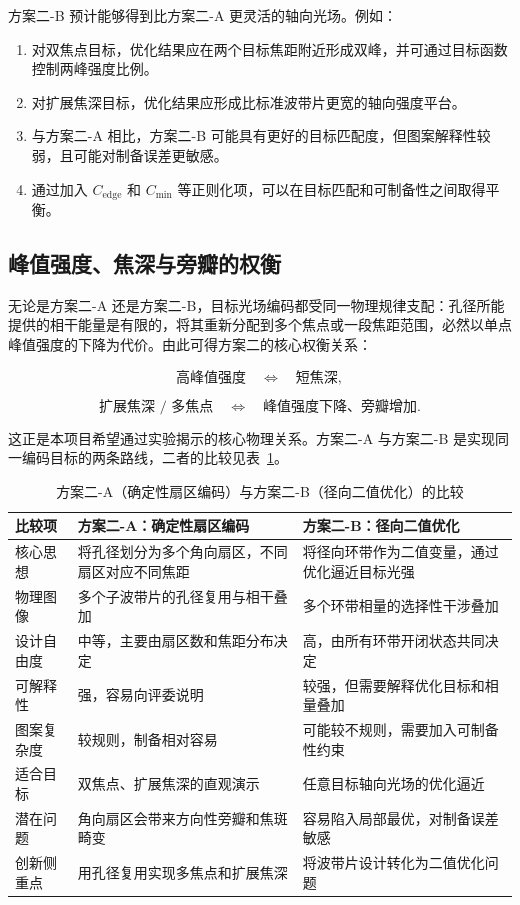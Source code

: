 \documentclass[UTF8,a4paper,11pt]{ctexart}
\begin{document}
方案二-B 预计能够得到比方案二-A 更灵活的轴向光场。例如：

\begin{enumerate}[label=(\arabic*)]
\item 对双焦点目标，优化结果应在两个目标焦距附近形成双峰，并可通过目标函数控制两峰强度比例。
\item 对扩展焦深目标，优化结果应形成比标准波带片更宽的轴向强度平台。
\item 与方案二-A 相比，方案二-B 可能具有更好的目标匹配度，但图案解释性较弱，且可能对制备误差更敏感。
\item 通过加入 $C_{\mathrm{edge}}$ 和 $C_{\mathrm{min}}$ 等正则化项，可以在目标匹配和可制备性之间取得平衡。
\end{enumerate}

\subsection{峰值强度、焦深与旁瓣的权衡}
\label{sec:tradeoff}

无论是方案二-A 还是方案二-B，目标光场编码都受同一物理规律支配：孔径所能提供的相干能量是有限的，将其重新分配到多个焦点或一段焦距范围，必然以单点峰值强度的下降为代价。由此可得方案二的核心权衡关系：

\[
\text{高峰值强度}
\quad \Longleftrightarrow \quad
\text{短焦深},
\]

\[
\text{扩展焦深 / 多焦点}
\quad \Longleftrightarrow \quad
\text{峰值强度下降、旁瓣增加}.
\]

这正是本项目希望通过实验揭示的核心物理关系。方案二-A 与方案二-B 是实现同一编码目标的两条路线，二者的比较见表~\ref{tab:method-compare}。

\begin{table}[H]
\centering
\caption{方案二-A（确定性扇区编码）与方案二-B（径向二值优化）的比较}
\label{tab:method-compare}
\begin{tabular}{p{3.2cm}p{5.1cm}p{5.1cm}}
\toprule
比较项 & 方案二-A：确定性扇区编码 & 方案二-B：径向二值优化 \\
\midrule
核心思想 & 将孔径划分为多个角向扇区，不同扇区对应不同焦距 & 将径向环带作为二值变量，通过优化逼近目标光强 \\
物理图像 & 多个子波带片的孔径复用与相干叠加 & 多个环带相量的选择性干涉叠加 \\
设计自由度 & 中等，主要由扇区数和焦距分布决定 & 高，由所有环带开闭状态共同决定 \\
可解释性 & 强，容易向评委说明 & 较强，但需要解释优化目标和相量叠加 \\
图案复杂度 & 较规则，制备相对容易 & 可能较不规则，需要加入可制备性约束 \\
适合目标 & 双焦点、扩展焦深的直观演示 & 任意目标轴向光场的优化逼近 \\
潜在问题 & 角向扇区会带来方向性旁瓣和焦斑畸变 & 容易陷入局部最优，对制备误差敏感 \\
创新侧重点 & 用孔径复用实现多焦点和扩展焦深 & 将波带片设计转化为二值优化问题 \\
\bottomrule
\end{tabular}
\end{table}
\end{document}
